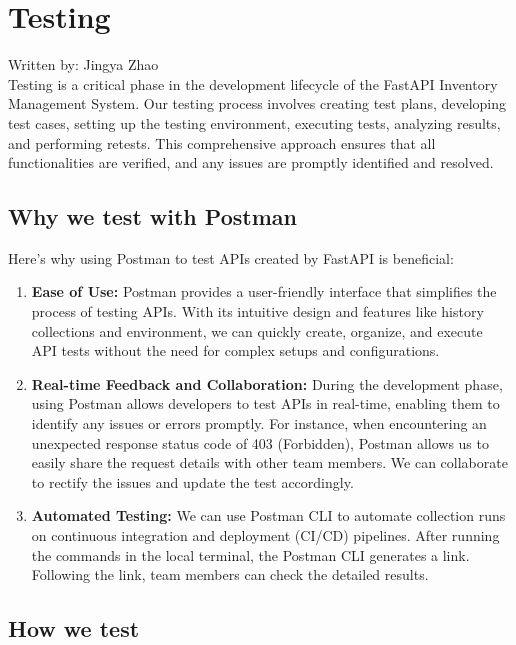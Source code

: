 \section{Testing}
{\tiny Written by: Jingya Zhao}\\

Testing is a critical phase in the development lifecycle of the FastAPI Inventory Management System. Our testing process involves creating test plans, developing test cases, setting up the testing environment, executing tests, analyzing results, and performing retests. This comprehensive approach ensures that all functionalities are verified, and any issues are promptly identified and resolved.

\subsection{Why we test with Postman}

Here’s why using Postman to test APIs created by FastAPI is beneficial:

\begin{enumerate}
    \item \textbf{Ease of Use:} Postman provides a user-friendly interface that simplifies the process of testing APIs. With its intuitive design and features like history collections and environment, we can quickly create, organize, and execute API tests without the need for complex setups and configurations.

    \item \textbf{Real-time Feedback and Collaboration:} During the development phase, using Postman allows developers to test APIs in real-time, enabling them to identify any issues or errors promptly. For instance, when encountering an unexpected response status code of 403 (Forbidden), Postman allows us to easily share the request details with other team members. We can collaborate to rectify the issues and update the test accordingly.

    \item \textbf{Automated Testing:} We can use Postman CLI to automate collection runs on continuous integration and deployment (CI/CD) pipelines. After running the commands in the local terminal, the Postman CLI generates a link. Following the link, team members can check the detailed results.
\end{enumerate}

\subsection{How we test}


